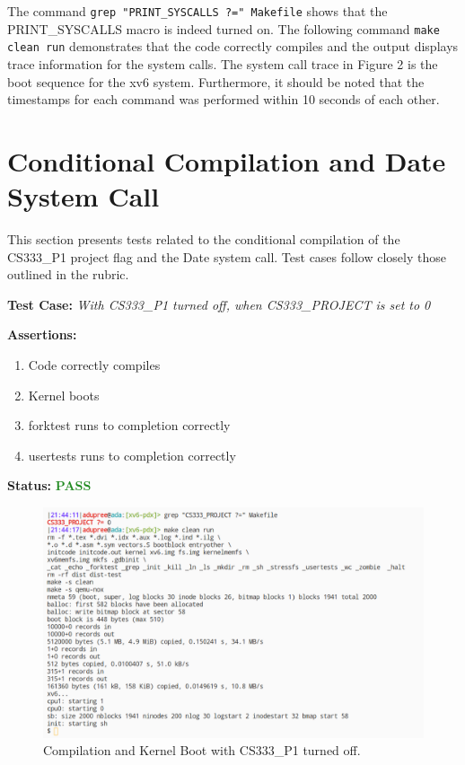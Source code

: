 \documentclass[11pt,letterpaper]{report}
\newcommand{\code}[1]{\colorbox{codegray}{\texttt{#1}}}
\begin{document}
{  \pagebreak

  The command \code{grep "PRINT\_SYSCALLS ?=" Makefile} shows that the PRINT\_SYSCALLS macro is indeed turned on.
  The following command \code{make clean run} demonstrates that the code correctly compiles and the output displays
  trace information for the system calls. The system call trace in Figure 2 is the boot sequence for the xv6 system.
  Furthermore, it should be noted that the timestamps for each command was performed within 10 seconds of each other.

  \pagebreak

  \section*{Conditional Compilation and Date System Call}
  This section presents tests related to the conditional compilation of the CS333\_P1 project flag and the Date system call.
  Test cases follow closely those outlined in the rubric. \hfill \break
  
  \noindent\textbf{Test Case:} \emph{With CS333\_P1 turned off, when CS333\_PROJECT is set to 0}
  
  \noindent\textbf{Assertions:}
  \begin{enumerate}[]
  \item Code correctly compiles
  \item Kernel boots
  \item forktest runs to completion correctly
  \item usertests runs to completion correctly
  \end{enumerate}  
  
  \noindent\textbf{Status:} \textcolor{ForestGreen}{\textbf{PASS}}
  
  \begin{figure}[h!]
	\centering
	\includegraphics[width=1\linewidth]{test3.png}
	\caption[PRINT\_SYSCALLS=0]{Compilation and Kernel Boot with CS333\_P1 turned off.}
	\label{fig:P1compileP0-1}
  \end{figure}

}
\end{document}
